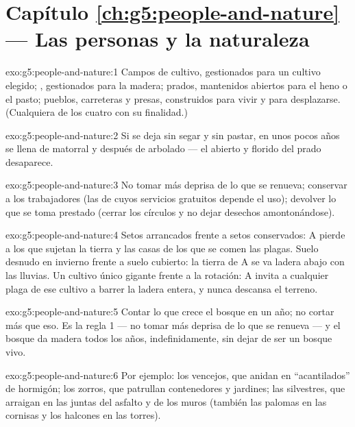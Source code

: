 \section*{Capítulo \ref{ch:g5:people-and-nature} --- Las personas y la naturaleza}

\begin{solution}{exo:g5:people-and-nature:1}
Campos de cultivo, gestionados para un cultivo elegido; ,
gestionados para la madera; prados, mantenidos abiertos para el heno o
el pasto; pueblos, carreteras y presas, construidos para vivir y para
desplazarse. (Cualquiera de los cuatro con su finalidad.)
\end{solution}

\begin{solution}{exo:g5:people-and-nature:2}
Si se deja sin segar y sin pastar, en unos pocos años se llena de
matorral y después de arbolado --- el  abierto y florido del
prado desaparece.
\end{solution}

\begin{solution}{exo:g5:people-and-nature:3}
No tomar más deprisa de lo que se renueva; conservar a los
trabajadores (las  de cuyos servicios gratuitos depende el
uso); devolver lo que se toma prestado (cerrar los círculos y no dejar
desechos amontonándose).
\end{solution}

\begin{solution}{exo:g5:people-and-nature:4}
Setos arrancados frente a setos conservados: A pierde a los que
sujetan la tierra y las casas de los que se comen las plagas. Suelo
desnudo en invierno frente a suelo cubierto: la tierra de A se va
ladera abajo con las lluvias. Un cultivo único gigante frente a la
rotación: A invita a cualquier plaga de ese cultivo a barrer la ladera
entera, y nunca descansa el terreno.
\end{solution}

\begin{solution}{exo:g5:people-and-nature:5}
Contar lo que crece el bosque en un año; no cortar más que eso. Es la
regla 1 --- no tomar más deprisa de lo que se renueva --- y el bosque
da madera todos los años, indefinidamente, sin dejar de ser un bosque
vivo.
\end{solution}

\begin{solution}{exo:g5:people-and-nature:6}
Por ejemplo: los vencejos, que anidan en ``acantilados'' de hormigón;
los zorros, que patrullan contenedores y jardines; las 
silvestres, que arraigan en las juntas del asfalto y de los muros
(también las palomas en las cornisas y los halcones en las torres).
\end{solution}

